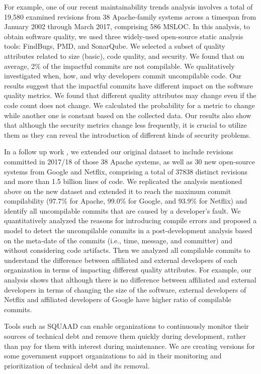 For example,
one of our recent maintainability trends analysis \cite{Behnamghader2017qrs} involves a total of 19,580 examined revisions from 38 Apache-family systems across a timespan from January 2002 through March 2017, comprising 586 MSLOC.
In this analysis, to obtain software quality, we used three widely-used open-source static analysis tools: FindBugs, PMD, and SonarQube.
We selected a subset of quality attributes related to size (basic), code quality, and security.
We found that on average, 2\% of the impactful  commits are  not compilable. We qualitatively investigated when, how, and why developers commit uncompilable code. Our results suggest that the impactful commits have different impact on the software quality metrics. We found that different quality attributes may change even if the code count does not change.
We calculated the probability for a metric to change while another one is constant based on the collected data.
Our results also show that although the security metrics change less frequently, it is crucial to utilize them as they can reveal the introduction of different kinds of security problems.

In a follow up work \cite{Behnamghader2018esem}, we extended
our original dataset
to include revisions committed in 2017/18 of those 38 Apache systems, as well as 30 new open-source systems from Google and Netflix, comprising a total of 37838 distinct revisions and more than 1.5 billion lines of code.
We replicated the analysis mentioned above on the new dataset and extended it to reach the maximum commit compilability (97.7\% for Apache, 99.0\% for Google, and 93.9\% for Netflix) and identify all uncompilable commits that are caused by a developer's fault.
We quantitatively analyzed the reasons for introducing compile errors and proposed a model to detect the uncompilable commits in a post-development analysis based on the meta-date of the commits (i.e., time, message, and committer) and without considering code artifacts.
Then we analyzed all compilable commits to understand the difference between affiliated and external developers of each organization in terms of impacting different quality attributes. 
For example, our analysis shows that although there is no difference between affiliated and external developers in terms of changing the size of the software, external developers of Netflix and affiliated developers of Google have higher ratio of compilable commits.

Tools such as SQUAAD can enable organizations to continuously monitor their sources of technical debt and remove them quickly during development, rather than pay for them with interest during maintenance. We are creating versions for some government support organizations to aid in their monitoring and prioritization of technical debt and its removal. 

